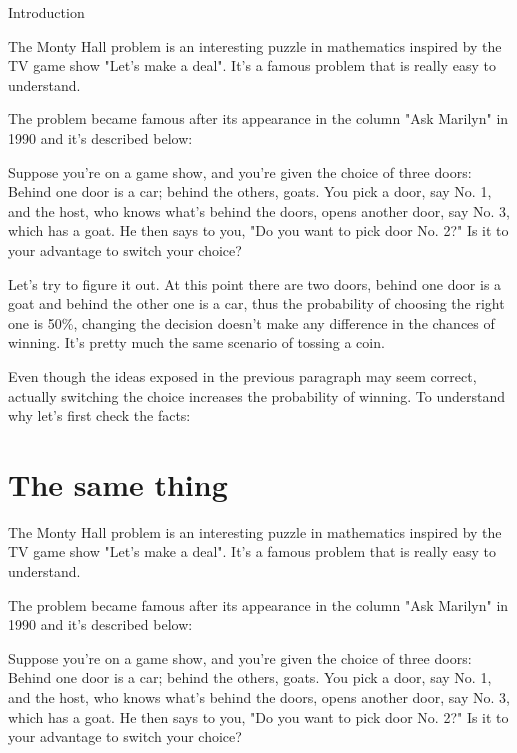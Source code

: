 \documentclass{resume}
\begin{document}
\maketitle

\begin{cvsection}{Introduction}
    
    The Monty Hall problem is an interesting puzzle in mathematics inspired by the TV 
    game show "Let's make a deal". It's a famous problem that is really easy to understand.
    
    The problem became famous after its appearance in the column "Ask Marilyn" in 1990 and 
    it's described below:
    
    Suppose you're on a game show, and you're given the choice of three doors: Behind one 
    door is a car; behind the others, goats. You pick a door, say No. 1, and the host, who 
    knows what's behind the doors, opens another door, say No. 3, which has a goat. He then 
    says to you, "Do you want to pick door No. 2?" Is it to your advantage to switch your
    choice?
    
    
    Let's try to figure it out. At this point there are two doors, behind one door is a goat 
    and behind the other one is a car, thus the probability of choosing the right one is 50\%,
    changing the decision doesn't make any difference in the chances of winning. It's pretty
    much the same scenario of tossing a coin.
    
    Even though the ideas exposed in the previous paragraph may seem correct, actually 
    switching the choice increases the probability of winning. To understand why let's 
    first check the facts:
\end{cvsection}


\section{The same thing}

The Monty Hall problem is an interesting puzzle in mathematics inspired by the TV 
game show "Let's make a deal". It's a famous problem that is really easy to understand.

The problem became famous after its appearance in the column "Ask Marilyn" in 1990 and 
it's described below:

Suppose you're on a game show, and you're given the choice of three doors: Behind one 
door is a car; behind the others, goats. You pick a door, say No. 1, and the host, who 
knows what's behind the doors, opens another door, say No. 3, which has a goat. He then 
says to you, "Do you want to pick door No. 2?" Is it to your advantage to switch your
choice?
\end{document}
